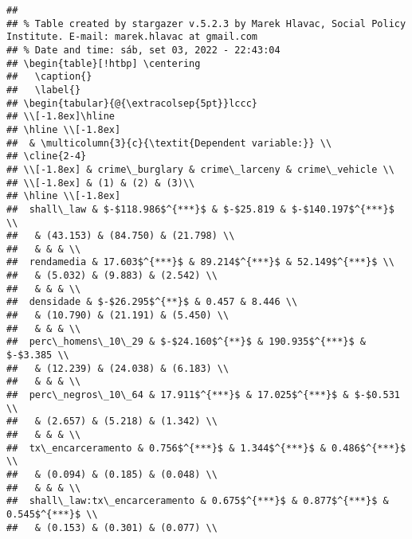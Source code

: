 \documentclass[
]{article}
\begin{document}
\begin{verbatim}
## 
## % Table created by stargazer v.5.2.3 by Marek Hlavac, Social Policy Institute. E-mail: marek.hlavac at gmail.com
## % Date and time: sáb, set 03, 2022 - 22:43:04
## \begin{table}[!htbp] \centering 
##   \caption{} 
##   \label{} 
## \begin{tabular}{@{\extracolsep{5pt}}lccc} 
## \\[-1.8ex]\hline 
## \hline \\[-1.8ex] 
##  & \multicolumn{3}{c}{\textit{Dependent variable:}} \\ 
## \cline{2-4} 
## \\[-1.8ex] & crime\_burglary & crime\_larceny & crime\_vehicle \\ 
## \\[-1.8ex] & (1) & (2) & (3)\\ 
## \hline \\[-1.8ex] 
##  shall\_law & $-$118.986$^{***}$ & $-$25.819 & $-$140.197$^{***}$ \\ 
##   & (43.153) & (84.750) & (21.798) \\ 
##   & & & \\ 
##  rendamedia & 17.603$^{***}$ & 89.214$^{***}$ & 52.149$^{***}$ \\ 
##   & (5.032) & (9.883) & (2.542) \\ 
##   & & & \\ 
##  densidade & $-$26.295$^{**}$ & 0.457 & 8.446 \\ 
##   & (10.790) & (21.191) & (5.450) \\ 
##   & & & \\ 
##  perc\_homens\_10\_29 & $-$24.160$^{**}$ & 190.935$^{***}$ & $-$3.385 \\ 
##   & (12.239) & (24.038) & (6.183) \\ 
##   & & & \\ 
##  perc\_negros\_10\_64 & 17.911$^{***}$ & 17.025$^{***}$ & $-$0.531 \\ 
##   & (2.657) & (5.218) & (1.342) \\ 
##   & & & \\ 
##  tx\_encarceramento & 0.756$^{***}$ & 1.344$^{***}$ & 0.486$^{***}$ \\ 
##   & (0.094) & (0.185) & (0.048) \\ 
##   & & & \\ 
##  shall\_law:tx\_encarceramento & 0.675$^{***}$ & 0.877$^{***}$ & 0.545$^{***}$ \\ 
##   & (0.153) & (0.301) & (0.077) \\ 

\end{verbatim}
\end{document}
